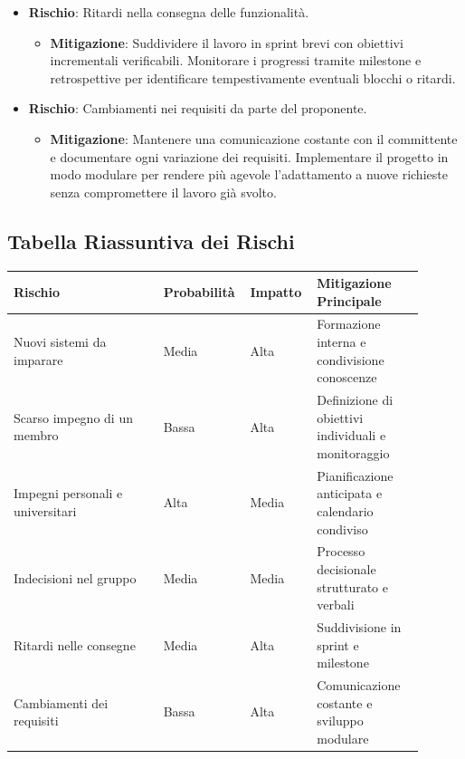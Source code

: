 \documentclass[a4paper,12pt]{article}
\begin{document}
\begin{itemize}
    \item \textbf{Rischio}: Ritardi nella consegna delle funzionalità.
        \begin{itemize}
            \item \textbf{Mitigazione}: Suddividere il lavoro in sprint brevi con obiettivi incrementali verificabili. Monitorare i progressi tramite milestone e retrospettive per identificare tempestivamente eventuali blocchi o ritardi.
        \end{itemize}
    
    \item \textbf{Rischio}: Cambiamenti nei requisiti da parte del proponente.
        \begin{itemize}
            \item \textbf{Mitigazione}: Mantenere una comunicazione costante con il committente e documentare ogni variazione dei requisiti. Implementare il progetto in modo modulare per rendere più agevole l’adattamento a nuove richieste senza compromettere il lavoro già svolto.
        \end{itemize}
\end{itemize}

\vspace{0.5cm}
\subsection{Tabella Riassuntiva dei Rischi}

\begin{center}
    \small
    \renewcommand{\arraystretch}{1.2}
    \begin{tabular}{|p{0.35\linewidth}|p{0.15\linewidth}|p{0.15\linewidth}|p{0.25\linewidth}|}
        \hline
        \rowcolor{gray!60}
        \textbf{Rischio} & \textbf{Probabilità} & \textbf{Impatto} & \textbf{Mitigazione Principale} \\
        \hline
        \rowcolor{white}
        Nuovi sistemi da imparare & Media & Alta & Formazione interna e condivisione conoscenze \\
        \hline
        \rowcolor{gray!20}
        Scarso impegno di un membro & Bassa & Alta & Definizione di obiettivi individuali e monitoraggio \\
        \hline
        \rowcolor{white}
        Impegni personali e universitari & Alta & Media & Pianificazione anticipata e calendario condiviso \\
        \hline
        \rowcolor{gray!20}
        Indecisioni nel gruppo & Media & Media & Processo decisionale strutturato e verbali \\
        \hline
        \rowcolor{white}
        Ritardi nelle consegne & Media & Alta & Suddivisione in sprint e milestone \\
        \hline
        \rowcolor{gray!20}
        Cambiamenti dei requisiti & Bassa & Alta & Comunicazione costante e sviluppo modulare \\
        \hline
    \end{tabular}
\end{center}
\end{document}
